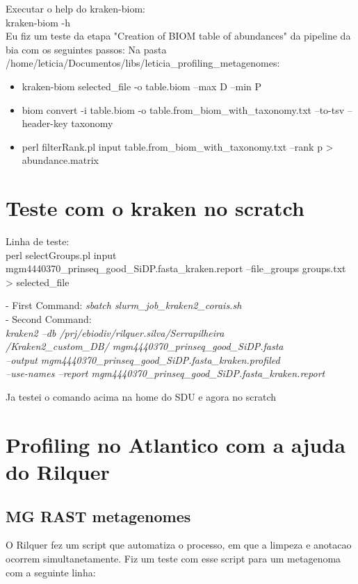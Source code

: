 \documentclass[12pt, a4paper]{report}
\begin{document}
Executar o help do kraken-biom: \\
kraken-biom -h \\

 
Eu fiz um teste da etapa "Creation of BIOM table of abundances" da pipeline da bia com os seguintes passos:
Na pasta\: 
 /home/leticia/Documentos/libs/leticia\_profiling\_metagenomes: 

\begin{itemize}
\item kraken-biom selected\_file -o table.biom --max D --min P 
\item biom convert -i table.biom -o table.from\_biom\_with\_taxonomy.txt --to-tsv --header-key taxonomy 
\item perl filterRank.pl \-\-input table.from\_biom\_with\_taxonomy.txt --rank p > abundance.matrix 
\end{itemize}

\section{Teste com o kraken no scratch}
Linha de teste: \\
perl selectGroups.pl \-\-input mgm4440370\_prinseq\_good\_SiDP.fasta\_kraken.report --file\_groups groups.txt > selected\_file


\begin{tcolorbox}[width=6.3in]
- First Command: \textit{sbatch slurm\_job\_kraken2\_corais.sh}\\
- Second Command: \textit{\\
kraken2 --db /prj/ebiodiv/rilquer.silva/Serrapilheira \\
/Kraken2\_custom\_DB/ mgm4440370\_prinseq\_good\_SiDP.fasta \\
--output mgm4440370\_prinseq\_good\_SiDP.fasta\_kraken.profiled \\
--use-names --report mgm4440370\_prinseq\_good\_SiDP.fasta\_kraken.report}
\end{tcolorbox}

Ja testei o comando acima na home do SDU e agora no scratch

\newpage
\section{Profiling no Atlantico com a ajuda do Rilquer}
\subsection{MG RAST metagenomes}
O Rilquer fez um script que automatiza o processo, em que a limpeza e anotacao ocorrem simultanetamente. Fiz um teste com esse script para um metagenoma com a seguinte linha:
\end{document}
